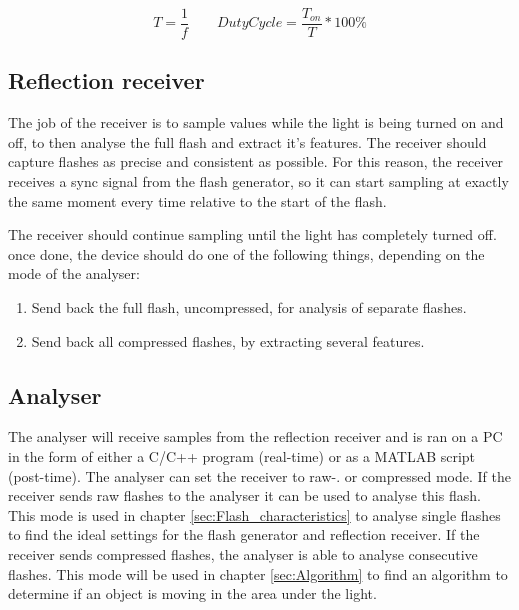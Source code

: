 \begin{equation}
\label{eq:1/f=T}
T=\frac{1}{f}
\qquad
DutyCycle=\frac{T_{on}}{T} * 100\%
\end{equation}


\subsection{Reflection receiver}
The job of the receiver is to sample values while the light is being turned on and off, to then analyse the full flash and extract it's features. The receiver should capture flashes as precise and consistent as possible. For this reason, the receiver receives a sync signal from the flash generator, so it can start sampling at exactly the same moment every time relative to the start of the flash. 

The receiver should continue sampling until the light has completely turned off. once done, the device should do one of the following things, depending on the mode of the analyser:
\begin{enumerate}[itemsep=-1ex]
	\item Send back the full flash, uncompressed, for analysis of separate flashes.
	\item Send back all compressed flashes, by extracting several features.
\end{enumerate}

\subsection{Analyser}
The analyser will receive samples from the reflection receiver and is ran on a PC in the form of either a C/C++ program (real-time) or as a MATLAB script (post-time). The analyser can set the receiver to raw-. or compressed mode. If the receiver sends raw flashes to the analyser it can be used to analyse this flash. This mode is used in chapter \ref{sec:Flash_characteristics} to analyse single flashes to find the ideal settings for the flash generator and reflection receiver. If the receiver sends compressed flashes, the analyser is able to analyse consecutive flashes. This mode will be used in chapter \ref{sec:Algorithm} to find an algorithm to determine if an object is moving in the area under the light.

